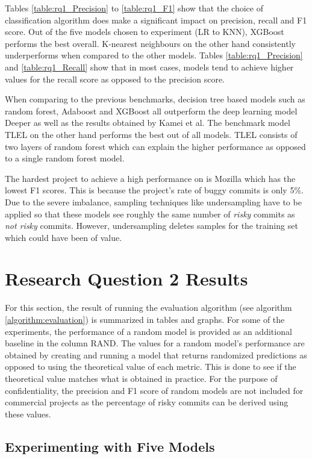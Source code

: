 \documentclass[../main.tex]{subfiles}
\begin{document}
Tables \ref{table:rq1_Precision} to \ref{table:rq1_F1} show that the choice of classification algorithm does make a significant impact on precision, recall and F1 score. Out of the five models chosen to experiment (LR to KNN), XGBoost performs the best overall. K-nearest neighbours on the other hand consistently underperforms when compared to the other models. Tables \ref{table:rq1_Precision} and \ref{table:rq1_Recall} show that in most cases, models tend to achieve higher values for the recall score as opposed to the precision score. 

When comparing to the previous benchmarks, decision tree based models such as random forest, Adaboost and XGBoost all outperform the deep learning model Deeper as well as the results obtained by Kamei et al. The benchmark model TLEL on the other hand performs the best out of all models. TLEL consists of two layers of random forest which can explain the higher performance as opposed to a single random forest model. 

The hardest project to achieve a high performance on is Mozilla which has the lowest F1 scores.  This is because the project's rate of buggy commits is only 5\%. Due to the severe imbalance, sampling techniques like undersampling have to be applied so that these models see roughly the same number of \textit{risky} commits as \textit{not risky} commits. However, undersampling deletes samples for the training set which could have been of value.

\section{Research Question 2 Results}

For this section, the result of running the evaluation algorithm (see algorithm \ref{algorithm:evaluation}) is summarized in tables and graphs. For some of the experiments, the performance of a random model is provided as an additional baseline in the column RAND. The values for a random model's performance are obtained by creating and running a model that returns randomized predictions as opposed to using the theoretical value of each metric. This is done to see if the theoretical value matches what is obtained in practice. For the purpose of confidentiality, the precision and F1 score of random models are not included for commercial projects as the percentage of risky commits can be derived using these values. 

\subsection{Experimenting with Five Models}\label{subsection:experiment1}
\end{document}
